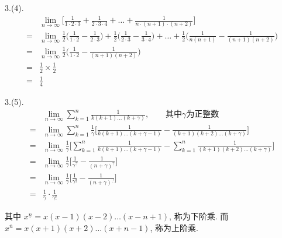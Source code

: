 \begin{solve*}
	3.(4).
	\begin{align*}
		&\lim_{n\rightarrow\infty}\Big[\frac{1}{1\cdot2\cdot3}+\frac{1}{2\cdot3\cdot4} +\dots +\frac{1}{n\cdot(n+1)\cdot(n+2)} \Big]\\
		=&\lim_{n\rightarrow\infty}\frac{1}{2}\Big(\frac{1}{1\cdot2}-\frac{1}{2\cdot3}\Big)+\frac{1}{2}\Big(\frac{1}{2\cdot3}-\frac{1}{3\cdot4}\Big)+\dots+\frac{1}{2}\Big(\frac{1}{n(n+1)}-\frac{1}{(n+1)(n+2)}\Big)\\
		=&\lim_{n\rightarrow\infty}\frac{1}{2}\Big(\frac{1}{1\cdot2}-\frac{1}{(n+1)(n+2)}\Big)\\
		=&\frac{1}{2}\times\frac{1}{2}\\
		=&\frac{1}{4}
	\end{align*}
\end{solve*}
\begin{solve*}
	3.(5).
	\begin{align*}
		&\lim_{n\rightarrow\infty}\sum_{k=1}^{n}\frac{1}{k(k+1)\dots(k+\gamma)},
		\qquad \text{其中}\gamma\text{为正整数}\\
		=&\lim_{n\rightarrow\infty} \sum_{k=1}^n \frac{1}{\gamma} \Big[\frac{1}{k(k+1)\dots(k+\gamma-1)}-\frac{1}{(k+1)(k+2)\dots(k+\gamma)}\Big]\\
		=&\lim_{n\rightarrow\infty}\frac{1}{\gamma}
		\Big[\sum_{k=1}^n \frac{1}{k(k+1)\dots(k+\gamma-1)}-\sum_{k=1}^n \frac{1}{(k+1)(k+2)\dots(k+\gamma)}\Big]\\
		=&\lim_{n\rightarrow\infty} \frac{1}{\gamma}\Big[\frac{1}{\gamma^{\underline{\gamma}}}-\frac{1}{(n+\gamma)^{\underline{\gamma}}}\Big]\\
		=&\lim_{n\rightarrow\infty} \frac{1}{\gamma}\Big[\frac{1}{\gamma!}-\frac{1}{(n+\gamma)^{\underline{\gamma}}}\Big]\\
		=&\frac{1}{\gamma}\cdot\frac{1}{\gamma!}		
	\end{align*}	
\end{solve*}
其中 $ x^{\underline{n}} = x(x-1)(x-2)\dots(x-n+1) $, 称为下阶乘. 而$ x^{\overline{n}} = x(x+1)(x+2)\dots(x+n-1) $, 称为上阶乘. 

